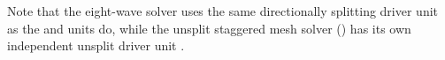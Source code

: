 
Note that the eight-wave solver uses the same directionally splitting driver 
unit  as the  and  units do, 
while the unsplit staggered mesh solver () has its
own independent unsplit driver unit .

